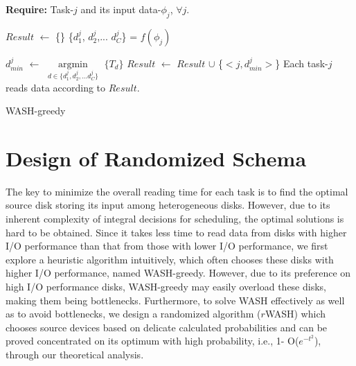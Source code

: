 \documentclass[conference]{IEEEtran}
\begin{document}
\begin{algorithm}[!t]

	\textbf{Require:} Task-$j$ and its input data-$\phi_j$, $\forall j$.

	\begin{algorithmic}[1]
		
		\State $Result$ $\gets$ \{\}\label{WASH-greedy:init}
			\State \{$d_{1}^j$, $d_{2}^j$,... $d_{C}^j$\} = $f(\phi_j)$
		
	
			\State $d_{min}^j$ $\gets$ $\mathop{\arg\min}\limits_{d \in \{d_{1}^j, d_{2}^j,... d_{C}^j\}}$ $\{T_d\}$
			\State $Result$ $\gets$ $Result$ $\cup$
			\{$< j, d_{min}^j>$\}
		\EndFor
	\State  Each task-$j$ reads data according to $Result$.
	\end{algorithmic}
	\caption{WASH-greedy}\label{WASH-greedy}
\end{algorithm}

\section{Design of Randomized Schema}\label{DESIGN_ALGORITHM}

The key to minimize the overall reading time for each task is to find the optimal source disk storing its input among heterogeneous disks. However, due to its inherent complexity of integral decisions for scheduling, the optimal solutions is hard to be obtained. Since it takes less time to read data from disks with higher I/O performance than that from those with lower I/O performance, we first explore a heuristic algorithm intuitively, which often chooses these disks with higher I/O performance, named WASH-greedy. However, due to its preference on high I/O performance disks, WASH-greedy may easily overload these disks, making them being bottlenecks. 
Furthermore, to solve WASH effectively as well as to avoid bottlenecks, we design a randomized algorithm ($r$WASH) which chooses source devices based on delicate calculated probabilities and can be proved concentrated on its optimum with high probability, i.e., 1- O($e^{-t^2}$), through our theoretical analysis.
\end{document}
